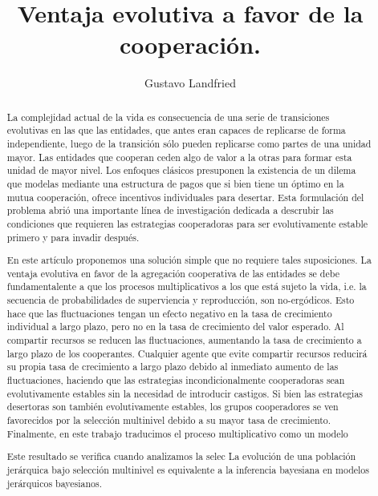 \documentclass[a4paper,10pt]{article}
\title{Ventaja evolutiva a favor de la cooperación.}
\author{Gustavo Landfried}
\begin{document}
\maketitle

\begin{abstract}
La complejidad actual de la vida es consecuencia de una serie de transiciones evolutivas en las que las entidades, que antes eran capaces de replicarse de forma independiente, luego de la transición sólo pueden replicarse como partes de una unidad mayor.
Las entidades que cooperan ceden algo de valor a la otras para formar esta unidad de mayor nivel.
Los enfoques clásicos presuponen la existencia de un dilema que modelas mediante una estructura de pagos que si bien tiene un óptimo en la mutua cooperación, ofrece incentivos individuales para desertar.
Esta formulación del problema abrió una importante línea de investigación dedicada a descrubir las condiciones que requieren las estrategias cooperadoras para ser evolutivamente estable primero y para invadir después.

En este artículo proponemos una solución simple que no requiere tales suposiciones.
La ventaja evolutiva en favor de la agregación cooperativa de las entidades se debe fundamentalente a que los procesos multiplicativos a los que está sujeto la vida, i.e. la secuencia de probabilidades de superviencia y reproducción, son no-ergódicos.
Esto hace que las fluctuaciones tengan un efecto negativo en la tasa de crecimiento individual a largo plazo, pero no en la tasa de crecimiento del valor esperado.
Al compartir recursos se reducen las fluctuaciones, aumentando la tasa de crecimiento a largo plazo de los cooperantes.
Cualquier agente que evite compartir recursos reducirá su propia tasa de crecimiento a largo plazo debido al inmediato aumento de las fluctuaciones, haciendo que las estrategias incondicionalmente cooperadoras sean evolutivamente estables sin la necesidad de introducir castigos.
Si bien las estrategias desertoras son también evolutivamente estables, los grupos cooperadores se ven favorecidos por la selección multinivel debido a su mayor tasa de crecimiento.
Finalmente, en este trabajo traducimos el proceso multiplicativo como un modelo

Este resultado se verifica cuando analizamos la selec La evolución de una población jerárquica bajo selección multinivel es equivalente a la inferencia bayesiana en modelos jerárquicos bayesianos.



\end{abstract}
\end{document}
